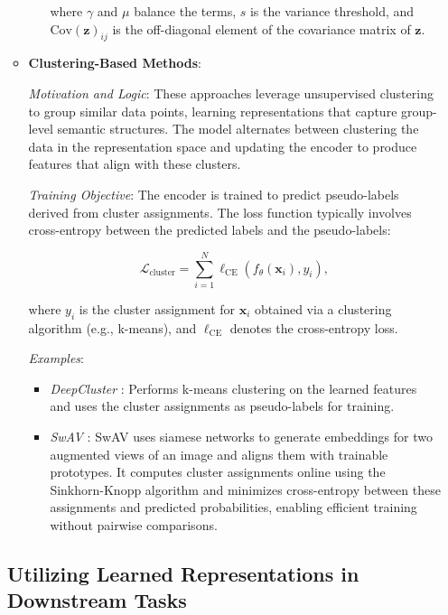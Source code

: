 \begin{itemize}
\begin{itemize}
\begin{itemize}
    where \( \gamma \) and \( \mu \) balance the terms, \( s \) is the variance threshold, and \( \text{Cov}(\mathbf{z})_{ij} \) is the off-diagonal element of the covariance matrix of \( \mathbf{z} \).
\end{itemize}

        \item \textbf{Clustering-Based Methods}:

        \emph{Motivation and Logic}: These approaches leverage unsupervised clustering to group similar data points, learning representations that capture group-level semantic structures. The model alternates between clustering the data in the representation space and updating the encoder to produce features that align with these clusters.

        \emph{Training Objective}: The encoder is trained to predict pseudo-labels derived from cluster assignments. The loss function typically involves cross-entropy between the predicted labels and the pseudo-labels:

        \[
        \mathcal{L}_{\text{cluster}} = \sum_{i=1}^N \ell_{\text{CE}}(f_{\theta}(\mathbf{x}_i), y_i),
        \]

        where \( y_i \) is the cluster assignment for \( \mathbf{x}_i \) obtained via a clustering algorithm (e.g., k-means), and \( \ell_{\text{CE}} \) denotes the cross-entropy loss.

        \emph{Examples}:
        \begin{itemize}
            \item \emph{DeepCluster} \citep{caron2018deep}: Performs k-means clustering on the learned features and uses the cluster assignments as pseudo-labels for training.
            \item \emph{SwAV} \citep{caron2020unsupervised}: SwAV uses siamese networks to generate embeddings for two augmented views of an image and aligns them with trainable prototypes. It computes cluster assignments online using the Sinkhorn-Knopp algorithm and minimizes cross-entropy between these assignments and predicted probabilities, enabling efficient training without pairwise comparisons.
        \end{itemize}
    \end{itemize}





\subsection{Utilizing Learned Representations in Downstream Tasks}


\end{itemize}
